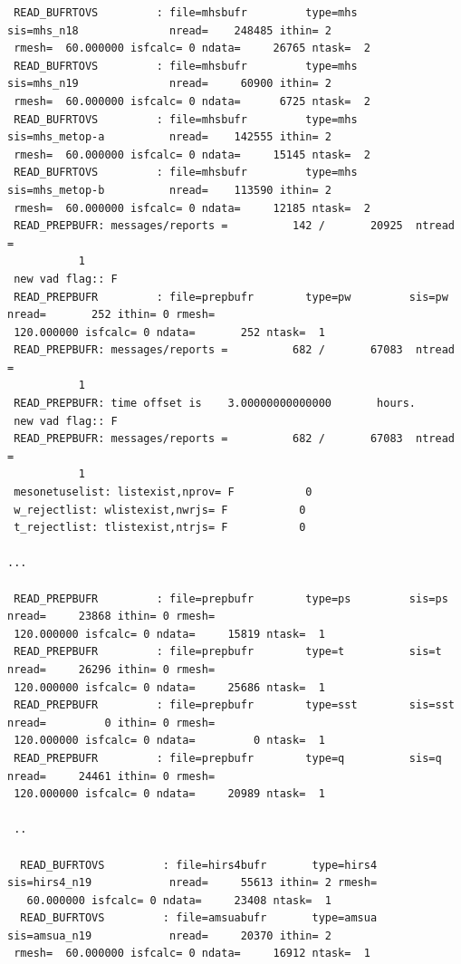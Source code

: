 \begin{tiny}
\begin{verbatim}
 READ_BUFRTOVS         : file=mhsbufr         type=mhs        sis=mhs_n18              nread=    248485 ithin= 2 
 rmesh=  60.000000 isfcalc= 0 ndata=     26765 ntask=  2
 READ_BUFRTOVS         : file=mhsbufr         type=mhs        sis=mhs_n19              nread=     60900 ithin= 2 
 rmesh=  60.000000 isfcalc= 0 ndata=      6725 ntask=  2
 READ_BUFRTOVS         : file=mhsbufr         type=mhs        sis=mhs_metop-a          nread=    142555 ithin= 2 
 rmesh=  60.000000 isfcalc= 0 ndata=     15145 ntask=  2
 READ_BUFRTOVS         : file=mhsbufr         type=mhs        sis=mhs_metop-b          nread=    113590 ithin= 2 
 rmesh=  60.000000 isfcalc= 0 ndata=     12185 ntask=  2
 READ_PREPBUFR: messages/reports =          142 /       20925  ntread =
           1
 new vad flag:: F
 READ_PREPBUFR         : file=prepbufr        type=pw         sis=pw                   nread=       252 ithin= 0 rmesh= 
 120.000000 isfcalc= 0 ndata=       252 ntask=  1
 READ_PREPBUFR: messages/reports =          682 /       67083  ntread =
           1
 READ_PREPBUFR: time offset is    3.00000000000000       hours.
 new vad flag:: F
 READ_PREPBUFR: messages/reports =          682 /       67083  ntread =
           1
 mesonetuselist: listexist,nprov= F           0
 w_rejectlist: wlistexist,nwrjs= F           0
 t_rejectlist: tlistexist,ntrjs= F           0

...

 READ_PREPBUFR         : file=prepbufr        type=ps         sis=ps                   nread=     23868 ithin= 0 rmesh= 
 120.000000 isfcalc= 0 ndata=     15819 ntask=  1
 READ_PREPBUFR         : file=prepbufr        type=t          sis=t                    nread=     26296 ithin= 0 rmesh= 
 120.000000 isfcalc= 0 ndata=     25686 ntask=  1
 READ_PREPBUFR         : file=prepbufr        type=sst        sis=sst                  nread=         0 ithin= 0 rmesh= 
 120.000000 isfcalc= 0 ndata=         0 ntask=  1
 READ_PREPBUFR         : file=prepbufr        type=q          sis=q                    nread=     24461 ithin= 0 rmesh= 
 120.000000 isfcalc= 0 ndata=     20989 ntask=  1
 
 ..
 
  READ_BUFRTOVS         : file=hirs4bufr       type=hirs4      sis=hirs4_n19            nread=     55613 ithin= 2 rmesh= 
   60.000000 isfcalc= 0 ndata=     23408 ntask=  1
  READ_BUFRTOVS         : file=amsuabufr       type=amsua      sis=amsua_n19            nread=     20370 ithin= 2 
 rmesh=  60.000000 isfcalc= 0 ndata=     16912 ntask=  1
\end{verbatim}
\end{tiny}
 
